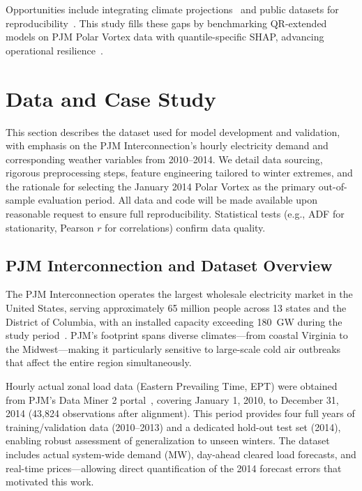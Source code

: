 \documentclass[12pt,a4paper]{article}
\begin{document}
Opportunities include integrating climate projections~\cite{assimakopoulos2000theta} and public datasets for reproducibility~\cite{hyndman2002state}. This study fills these gaps by benchmarking QR-extended models on PJM Polar Vortex data with quantile-specific SHAP, advancing operational resilience~\cite{gardner2006exponential,makridakis2000m3}.

\section{Data and Case Study}
\label{sec:data}

This section describes the dataset used for model development and validation, with emphasis on the PJM Interconnection's hourly electricity demand and corresponding weather variables from 2010--2014. We detail data sourcing, rigorous preprocessing steps, feature engineering tailored to winter extremes, and the rationale for selecting the January 2014 Polar Vortex as the primary out-of-sample evaluation period. All data and code will be made available upon reasonable request to ensure full reproducibility. Statistical tests (e.g., ADF for stationarity, Pearson $r$ for correlations) confirm data quality.

\subsection{PJM Interconnection and Dataset Overview}

The PJM Interconnection operates the largest wholesale electricity market in the United States, serving approximately 65 million people across 13 states and the District of Columbia, with an installed capacity exceeding 180~GW during the study period~\cite{maciejowska2020assessing}. PJM's footprint spans diverse climates---from coastal Virginia to the Midwest---making it particularly sensitive to large-scale cold air outbreaks that affect the entire region simultaneously.

Hourly actual zonal load data (Eastern Prevailing Time, EPT) were obtained from PJM's Data Miner 2 portal~\cite{tastu2015space}, covering January 1, 2010, to December 31, 2014 (43,824 observations after alignment). This period provides four full years of training/validation data (2010--2013) and a dedicated hold-out test set (2014), enabling robust assessment of generalization to unseen winters. The dataset includes actual system-wide demand (MW), day-ahead cleared load forecasts, and real-time prices---allowing direct quantification of the 2014 forecast errors that motivated this work.
\end{document}
